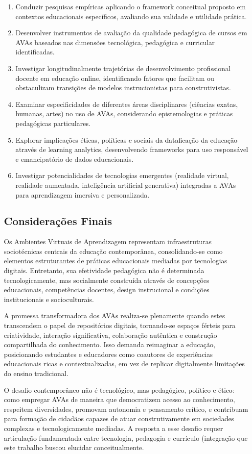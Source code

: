 \documentclass[portuguese]{sbc2025}%
\begin{document}
\begin{enumerate}
    \item Conduzir pesquisas empíricas aplicando o framework conceitual proposto em contextos educacionais específicos, avaliando sua validade e utilidade prática.
    \item Desenvolver instrumentos de avaliação da qualidade pedagógica de cursos em AVAs baseados nas dimensões tecnológica, pedagógica e curricular identificadas.
    \item Investigar longitudinalmente trajetórias de desenvolvimento profissional docente em educação online, identificando fatores que facilitam ou obstaculizam transições de modelos instrucionistas para construtivistas.
    \item Examinar especificidades de diferentes áreas disciplinares (ciências exatas, humanas, artes) no uso de AVAs, considerando epistemologias e práticas pedagógicas particulares.
    \item Explorar implicações éticas, políticas e sociais da dataficação da educação através de learning analytics, desenvolvendo frameworks para uso responsável e emancipatório de dados educacionais.
    \item Investigar potencialidades de tecnologias emergentes (realidade virtual, realidade aumentada, inteligência artificial generativa) integradas a AVAs para aprendizagem imersiva e personalizada.
\end{enumerate}

\subsection{Considerações Finais}

Os Ambientes Virtuais de Aprendizagem representam infraestruturas sociotécnicas centrais da educação contemporânea, consolidando-se como elementos estruturantes de práticas educacionais mediadas por tecnologias digitais. Entretanto, sua efetividade pedagógica não é determinada tecnologicamente, mas socialmente construída através de concepções educacionais, competências docentes, design instrucional e condições institucionais e socioculturais.

A promessa transformadora dos AVAs realiza-se plenamente quando estes transcendem o papel de repositórios digitais, tornando-se espaços férteis para criatividade, interação significativa, colaboração autêntica e construção compartilhada do conhecimento. Isso demanda reimaginar a educação, posicionando estudantes e educadores como coautores de experiências educacionais ricas e contextualizadas, em vez de replicar digitalmente limitações do ensino tradicional.

O desafio contemporâneo não é tecnológico, mas pedagógico, político e ético: como empregar AVAs de maneira que democratizem acesso ao conhecimento, respeitem diversidades, promovam autonomia e pensamento crítico, e contribuam para formação de cidadãos capazes de atuar construtivamente em sociedades complexas e tecnologicamente mediadas. A resposta a esse desafio requer articulação fundamentada entre tecnologia, pedagogia e currículo (integração que este trabalho buscou elucidar conceitualmente.



\end{document}

